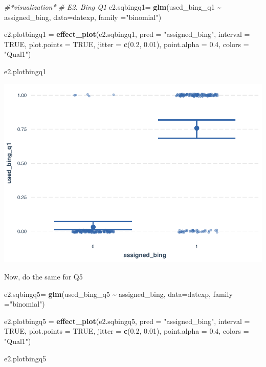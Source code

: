 \documentclass[
  11pt,
]{article}
\newenvironment{Shaded}{\begin{snugshade}}{\end{snugshade}}
\newcommand{\AttributeTok}[1]{\textcolor[rgb]{0.13,0.29,0.53}{#1}}
\newcommand{\CommentTok}[1]{\textcolor[rgb]{0.56,0.35,0.01}{\textit{#1}}}
\newcommand{\ConstantTok}[1]{\textcolor[rgb]{0.56,0.35,0.01}{#1}}
\newcommand{\FloatTok}[1]{\textcolor[rgb]{0.00,0.00,0.81}{#1}}
\newcommand{\FunctionTok}[1]{\textcolor[rgb]{0.13,0.29,0.53}{\textbf{#1}}}
\newcommand{\NormalTok}[1]{#1}
\newcommand{\OtherTok}[1]{\textcolor[rgb]{0.56,0.35,0.01}{#1}}
\newcommand{\SpecialCharTok}[1]{\textcolor[rgb]{0.81,0.36,0.00}{\textbf{#1}}}
\newcommand{\StringTok}[1]{\textcolor[rgb]{0.31,0.60,0.02}{#1}}
\begin{document}
\begin{Shaded}
\begin{Highlighting}[]
\CommentTok{\#\textquotesingle{}*visualization*}
\CommentTok{\# E2. Bing Q1}
\NormalTok{e2.sqbingq1}\OtherTok{=} \FunctionTok{glm}\NormalTok{(used\_bing\_q1 }\SpecialCharTok{\textasciitilde{}}\NormalTok{ assigned\_bing, }\AttributeTok{data=}\NormalTok{datexp, }\AttributeTok{family =}\StringTok{"binomial"}\NormalTok{)}

\NormalTok{e2.plotbingq1 }\OtherTok{=} \FunctionTok{effect\_plot}\NormalTok{(e2.sqbingq1, }\AttributeTok{pred =} \StringTok{"assigned\_bing"}\NormalTok{, }\AttributeTok{interval =} \ConstantTok{TRUE}\NormalTok{, }\AttributeTok{plot.points =} \ConstantTok{TRUE}\NormalTok{, }\AttributeTok{jitter =} \FunctionTok{c}\NormalTok{(}\FloatTok{0.2}\NormalTok{, }\FloatTok{0.01}\NormalTok{), }\AttributeTok{point.alpha =} \FloatTok{0.4}\NormalTok{, }\AttributeTok{colors =} \StringTok{"Qual1"}\NormalTok{)}

\NormalTok{e2.plotbingq1}
\end{Highlighting}
\end{Shaded}

\includegraphics{analysis-July19_files/figure-latex/unnamed-chunk-16-1.pdf}

Now, do the same for Q5

\begin{Shaded}
\begin{Highlighting}[]
\NormalTok{e2.sqbingq5}\OtherTok{=} \FunctionTok{glm}\NormalTok{(used\_bing\_q5 }\SpecialCharTok{\textasciitilde{}}\NormalTok{ assigned\_bing, }\AttributeTok{data=}\NormalTok{datexp, }\AttributeTok{family =}\StringTok{"binomial"}\NormalTok{)}

\NormalTok{e2.plotbingq5 }\OtherTok{=} \FunctionTok{effect\_plot}\NormalTok{(e2.sqbingq5, }\AttributeTok{pred =} \StringTok{"assigned\_bing"}\NormalTok{, }\AttributeTok{interval =} \ConstantTok{TRUE}\NormalTok{, }\AttributeTok{plot.points =} \ConstantTok{TRUE}\NormalTok{, }\AttributeTok{jitter =} \FunctionTok{c}\NormalTok{(}\FloatTok{0.2}\NormalTok{, }\FloatTok{0.01}\NormalTok{), }\AttributeTok{point.alpha =} \FloatTok{0.4}\NormalTok{, }\AttributeTok{colors =} \StringTok{"Qual1"}\NormalTok{)}

\NormalTok{e2.plotbingq5}
\end{Highlighting}
\end{Shaded}
\end{document}
